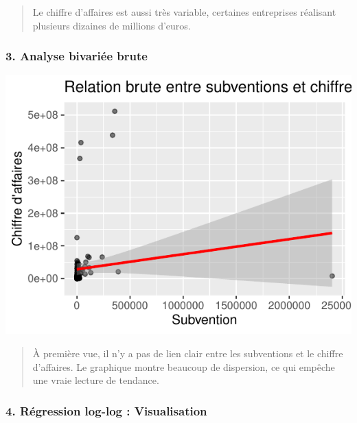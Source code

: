 \documentclass[mstat,12pt]{unswthesis}
\begin{document}
\begin{quote}
Le chiffre d'affaires est aussi très variable, certaines entreprises
réalisant plusieurs dizaines de millions d'euros.
\end{quote}

\medskip

\subsubsection{3. Analyse bivariée
brute}\label{analyse-bivariuxe9e-brute}

\medskip

\includegraphics{scdon2-UPV-report-template_sansPython_files/figure-latex/unnamed-chunk-23-1.pdf}

\begin{quote}
À première vue, il n'y a pas de lien clair entre les subventions et le
chiffre d'affaires. Le graphique montre beaucoup de dispersion, ce qui
empêche une vraie lecture de tendance.
\end{quote}

\medskip

\subsubsection{4. Régression log-log :
Visualisation}\label{ruxe9gression-log-log-visualisation}

\medskip
\end{document}
